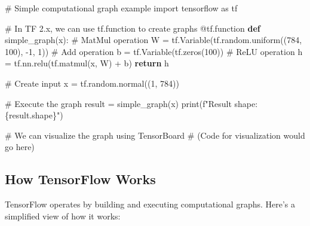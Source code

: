 \documentclass[
  letterpaper,
  DIV=11,
  numbers=noendperiod]{scrreprt}
\newenvironment{Shaded}{\begin{snugshade}}{\end{snugshade}}
\newcommand{\AttributeTok}[1]{\textcolor[rgb]{0.40,0.45,0.13}{#1}}
\newcommand{\BuiltInTok}[1]{\textcolor[rgb]{0.00,0.23,0.31}{#1}}
\newcommand{\CommentTok}[1]{\textcolor[rgb]{0.37,0.37,0.37}{#1}}
\newcommand{\ControlFlowTok}[1]{\textcolor[rgb]{0.00,0.23,0.31}{\textbf{#1}}}
\newcommand{\DecValTok}[1]{\textcolor[rgb]{0.68,0.00,0.00}{#1}}
\newcommand{\ImportTok}[1]{\textcolor[rgb]{0.00,0.46,0.62}{#1}}
\newcommand{\KeywordTok}[1]{\textcolor[rgb]{0.00,0.23,0.31}{\textbf{#1}}}
\newcommand{\NormalTok}[1]{\textcolor[rgb]{0.00,0.23,0.31}{#1}}
\newcommand{\OperatorTok}[1]{\textcolor[rgb]{0.37,0.37,0.37}{#1}}
\newcommand{\SpecialCharTok}[1]{\textcolor[rgb]{0.37,0.37,0.37}{#1}}
\newcommand{\SpecialStringTok}[1]{\textcolor[rgb]{0.13,0.47,0.30}{#1}}
\begin{document}
\begin{Shaded}
\begin{Highlighting}[]
\CommentTok{\# Simple computational graph example}
\ImportTok{import}\NormalTok{ tensorflow }\ImportTok{as}\NormalTok{ tf}

\CommentTok{\# In TF 2.x, we can use tf.function to create graphs}
\AttributeTok{@tf.function}
\KeywordTok{def}\NormalTok{ simple\_graph(x):}
    \CommentTok{\# MatMul operation}
\NormalTok{    W }\OperatorTok{=}\NormalTok{ tf.Variable(tf.random.uniform((}\DecValTok{784}\NormalTok{, }\DecValTok{100}\NormalTok{), }\OperatorTok{{-}}\DecValTok{1}\NormalTok{, }\DecValTok{1}\NormalTok{))}
    \CommentTok{\# Add operation}
\NormalTok{    b }\OperatorTok{=}\NormalTok{ tf.Variable(tf.zeros(}\DecValTok{100}\NormalTok{))}
    \CommentTok{\# ReLU operation}
\NormalTok{    h }\OperatorTok{=}\NormalTok{ tf.nn.relu(tf.matmul(x, W) }\OperatorTok{+}\NormalTok{ b)}
    \ControlFlowTok{return}\NormalTok{ h}

\CommentTok{\# Create input}
\NormalTok{x }\OperatorTok{=}\NormalTok{ tf.random.normal((}\DecValTok{1}\NormalTok{, }\DecValTok{784}\NormalTok{))}

\CommentTok{\# Execute the graph}
\NormalTok{result }\OperatorTok{=}\NormalTok{ simple\_graph(x)}
\BuiltInTok{print}\NormalTok{(}\SpecialStringTok{f"Result shape: }\SpecialCharTok{\{}\NormalTok{result}\SpecialCharTok{.}\NormalTok{shape}\SpecialCharTok{\}}\SpecialStringTok{"}\NormalTok{)}

\CommentTok{\# We can visualize the graph using TensorBoard}
\CommentTok{\# (Code for visualization would go here)}
\end{Highlighting}
\end{Shaded}

\subsection{How TensorFlow Works}\label{how-tensorflow-works}

TensorFlow operates by building and executing computational graphs.
Here's a simplified view of how it works:
\end{document}
